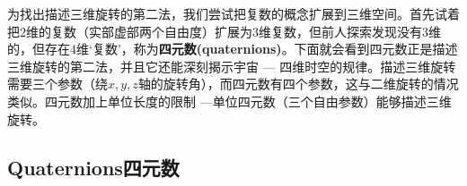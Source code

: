 为找出描述三维旋转的第二法，我们尝试把复数的概念扩展到三维空间。首先试着把$2$维的复数（实部虚部两个自由度）扩展为$3$维复数，但前人探索发现没有$3$维的，但存在$4$维‘复数’，称为{\bf 四元数(quaternions)}。下面就会看到四元数正是描述三维旋转的第二法，并且它还能深刻揭示宇宙 --- 四维时空的规律。描述三维旋转需要三个参数（绕$x,y,z$轴的旋转角），而四元数有四个参数，这与二维旋转的情况类似。四元数加上单位长度的限制 ---单位四元数（三个自由参数）能够描述三维旋转。

\subsection[四元数]{Quaternions\quad 四元数}
